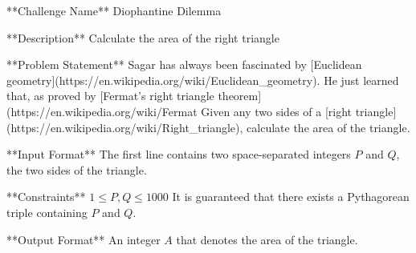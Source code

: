 **Challenge Name**  
Diophantine Dilemma

**Description**  
Calculate the area of the right triangle

**Problem Statement**  
Sagar has always been fascinated by [Euclidean geometry](https://en.wikipedia.org/wiki/Euclidean_geometry). He just learned that, as proved by [Fermat's right triangle theorem](https://en.wikipedia.org/wiki/Fermat%
Given any two sides of a [right triangle](https://en.wikipedia.org/wiki/Right_triangle), calculate the area of the triangle. 

**Input Format**  
The first line contains two space-separated integers $P$ and $Q$, the two sides of the triangle.

**Constraints**  
$1 \leq P, Q \leq 1000$  
It is guaranteed that there exists a Pythagorean triple containing $P$ and $Q$.

**Output Format**  
An integer $A$ that denotes the area of the triangle.
